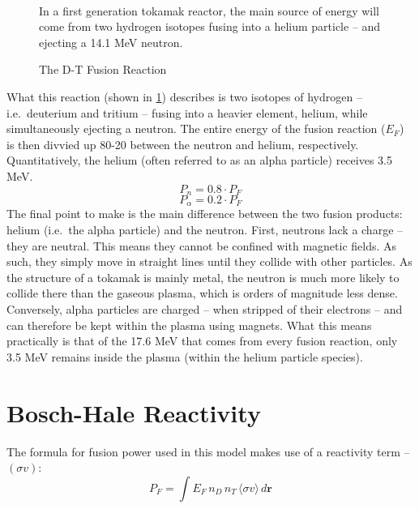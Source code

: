 \begin{figure}
	\centering
	\begin{adjustbox}{width=0.75\textwidth}
		
	\end{adjustbox}
	\caption{The D-T Fusion Reaction} ~\\
	\small In a first generation tokamak reactor, the main source of energy will come from two hydrogen isotopes fusing into a helium particle -- and ejecting a 14.1 MeV neutron.
	\label{fig:fusion_reaction}
\end{figure}

What this reaction (shown in \cref{fig:fusion_reaction}) describes is two isotopes of hydrogen -- i.e.\ deuterium and tritium -- fusing into a heavier element, helium, while simultaneously ejecting a neutron. The entire energy of the fusion reaction ($E_F$) is then divvied up 80-20 between the neutron and helium, respectively. Quantitatively, the helium (often referred to as an alpha particle) receives 3.5 MeV.
\begin{equation}
	P_n = 0.8 \cdot P_F
	\label{eq:p_n}
\end{equation}
\begin{equation}
	P_\alpha = 0.2 \cdot P_F
	\label{eq:palpha}
\end{equation}
The final point to make is the main difference between the two fusion products: helium (i.e.\ the alpha particle) and the neutron. First, neutrons lack a charge -- they are neutral. This means they cannot be confined with magnetic fields. As such, they simply move in straight lines until they collide with other particles. As the structure of a tokamak is mainly metal, the neutron is much more likely to collide there than the gaseous plasma, which is orders of magnitude less dense. Conversely, alpha particles are charged -- when stripped of their electrons -- and can therefore be kept within the plasma using magnets. What this means practically is that of the 17.6 MeV that comes from every fusion reaction, only 3.5 MeV remains inside the plasma (within the helium particle species).

\section{Bosch-Hale Reactivity}

The formula for fusion power used in this model makes use of a reactivity term -- $(\sigma v)$:\cite{jeff}
\begin{equation}
	P_F = \int E_F \, n_D \, n_T \, \langle \sigma v \rangle \, d \textbf{r}
\end{equation}


